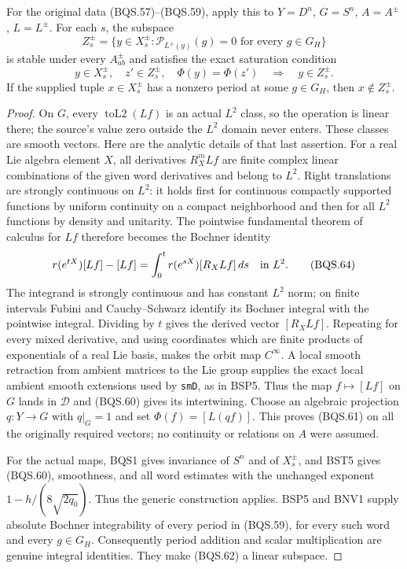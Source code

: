 For the original data (BQS.57)--(BQS.59), apply this to
$Y=D^n$, $G=S^n$, $A=A^\pm$, $L=L^\pm$.
For each $s$, the subspace
\[
 Z_s^\pm=\{y\in X_s^\pm:
                     \mathcal P_{L^\pm(y)}(g)=0
                           \text{ for every }g\in G_H\}
 \tag{BQS.62}
\]
is stable under every $A^\pm_{ab}$ and satisfies the exact
saturation condition
\[
 y\in X_s^\pm,\quad z'\in Z_s^\pm,\quad \Phi(y)=\Phi(z')
                      \quad\Longrightarrow\quad y\in Z_s^\pm .
 \tag{BQS.63}
\]
If the supplied tuple $x\in X_s^\pm$ has a nonzero period
at some $g\in G_H$, then $x\notin Z_s^\pm$.

\begin{proof}
On $G$, every $\operatorname{toL2}(Lf)$ is an actual $L^2$ class,
so the operation is linear there; the source's value zero outside
the $L^2$ domain never enters.  These classes are smooth vectors.
Here are the analytic details of that last assertion.
For a real Lie algebra element $X$, all derivatives $R_X^mLf$
are finite complex linear combinations of the given word derivatives
and belong to $L^2$.
Right translations are strongly continuous on $L^2$:
it holds first for continuous compactly supported functions by
uniform continuity on a compact neighborhood and then for all
$L^2$ functions by density and unitarity.
The pointwise fundamental theorem of calculus for $Lf$ therefore
becomes the Bochner identity
\[
 r(e^{tX})[Lf]-[Lf]
                =\int_0^t r(e^{sX})[R_XLf]\,ds
                   \quad\hbox{in }L^2 .
 \tag{BQS.64}
\]
The integrand is strongly continuous and has constant $L^2$ norm;
on finite intervals Fubini and Cauchy--Schwarz identify its
Bochner integral with the pointwise integral.
Dividing by $t$ gives the derived vector $[R_XLf]$.
Repeating for every mixed derivative, and using coordinates which
are finite products of exponentials of a real Lie basis, makes
the orbit map $C^\infty$.  A local smooth retraction from ambient
matrices to the Lie group supplies the exact local ambient smooth
extensions used by \texttt{smD}, as in BSP5.
Thus the map $f\mapsto[Lf]$ on $G$ lands in $\mathcal D$ and
(BQS.60) gives its intertwining.
Choose an algebraic projection $q:Y\to G$ with $q|_G=1$ and set
$\Phi(f)=[L(qf)]$.  This proves (BQS.61) on all the originally
required vectors; no continuity or relations on $A$ were assumed.

For the actual maps, BQS1 gives invariance of $S^n$ and of
$X_s^\pm$, and BST5 gives (BQS.60), smoothness, and all word
estimates with the unchanged exponent
$1-h/(8\sqrt{2q_0})$.
Thus the generic construction applies.
BSP5 and BNV1 supply absolute Bochner integrability of every
period in (BQS.59), for every such word and every $g\in G_H$.
Consequently period addition and scalar multiplication are genuine
integral identities.  They make (BQS.62) a linear subspace.


\end{proof}
